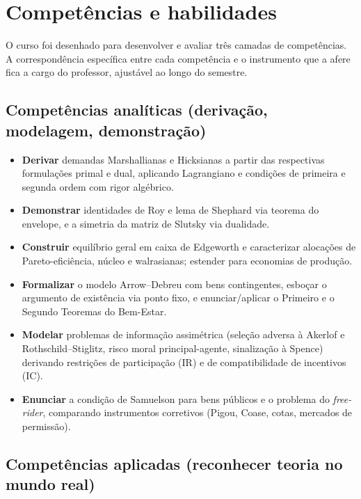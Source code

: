 \documentclass[11pt,a4paper]{article}
\begin{document}
\section{Competências e habilidades}

O curso foi desenhado para desenvolver e avaliar três camadas de competências. A correspondência específica entre cada competência e o instrumento que a afere fica a cargo do professor, ajustável ao longo do semestre.

\subsection*{Competências analíticas (derivação, modelagem, demonstração)}

\begin{itemize}
  \item \textbf{Derivar} demandas Marshallianas e Hicksianas a partir das respectivas formulações primal e dual, aplicando Lagrangiano e condições de primeira e segunda ordem com rigor algébrico.
  \item \textbf{Demonstrar} identidades de Roy e lema de Shephard via teorema do envelope, e a simetria da matriz de Slutsky via dualidade.
  \item \textbf{Construir} equilíbrio geral em caixa de Edgeworth e caracterizar alocações de Pareto-eficiência, núcleo e walrasianas; estender para economias de produção.
  \item \textbf{Formalizar} o modelo Arrow--Debreu com bens contingentes, esboçar o argumento de existência via ponto fixo, e enunciar/aplicar o Primeiro e o Segundo Teoremas do Bem-Estar.
  \item \textbf{Modelar} problemas de informação assimétrica (seleção adversa \`a Akerlof e Rothschild--Stiglitz, risco moral principal-agente, sinalização \`a Spence) derivando restrições de participação (IR) e de compatibilidade de incentivos (IC).
  \item \textbf{Enunciar} a condição de Samuelson para bens públicos e o problema do \textit{free-rider}, comparando instrumentos corretivos (Pigou, Coase, cotas, mercados de permissão).
\end{itemize}

\subsection*{Competências aplicadas (reconhecer teoria no mundo real)}
\end{document}
